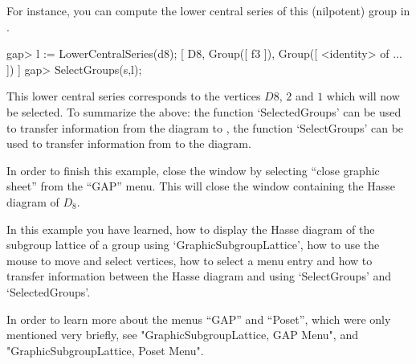 For instance,  you can compute the lower central series of this (nilpotent)
group in {\GAP}.

\begintt
gap> l := LowerCentralSeries(d8);
[ D8, Group([ f3 ]), Group([ <identity> of ... ]) ]
gap> SelectGroups(s,l);
\endtt

This lower central series corresponds to the vertices $D8$, $2$ and $1$
which will now be selected.  To summarize the above: the function
`SelectedGroups' can be used to transfer information from the diagram to
{\GAP}, the function `SelectGroups' can be used to transfer information
from {\GAP} to the diagram.




In order to finish this example, close the window by selecting ``close
graphic sheet'' from the ``GAP'' menu.  This will close the window
containing the Hasse diagram of $D_8$.

In this example you have learned, how to display the Hasse diagram of the
subgroup lattice of a group using `GraphicSubgroupLattice', how to use the
mouse to move and select vertices, how to select a menu entry and how to
transfer information between the Hasse diagram and {\GAP} using `SelectGroups'
and `SelectedGroups'.

In order to learn more about the menus ``GAP'' and ``Poset'', which were only
mentioned very briefly, see "GraphicSubgroupLattice, GAP Menu", and
"GraphicSubgroupLattice, Poset Menu".  


